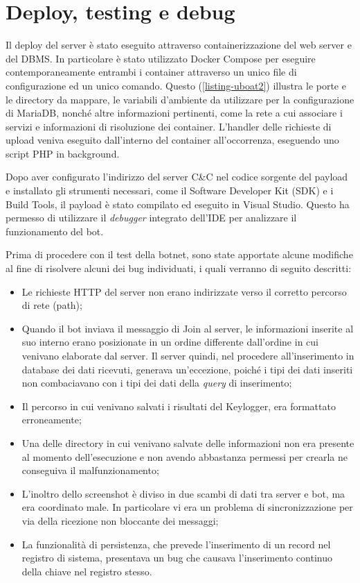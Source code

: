 \section{Deploy, testing e debug}
Il deploy del server è stato eseguito attraverso containerizzazione del web server e del DBMS. In particolare è stato utilizzato Docker Compose per eseguire contemporaneamente entrambi i container attraverso un unico file di configurazione ed un unico comando.
Questo (\ref{listing-uboat2}) illustra le porte e le directory da mappare, le variabili d'ambiente da utilizzare per la configurazione di MariaDB, nonché altre informazioni pertinenti, come la rete a cui associare i servizi e informazioni di risoluzione dei container.
L'handler delle richieste di upload veniva eseguito dall'interno del container all'occorrenza, eseguendo uno script PHP in background.

\medskip 
Dopo aver configurato l'indirizzo del server  C\&C nel codice sorgente del payload e installato gli strumenti necessari, come il Software Developer Kit (SDK) e i Build Tools, il payload è stato compilato ed eseguito in Visual Studio. Questo ha permesso di utilizzare il \textit{debugger} integrato dell'IDE per analizzare il funzionamento del bot.

\medskip
Prima di procedere con il test della botnet, sono state apportate alcune modifiche al fine di risolvere alcuni dei bug individuati, i quali verranno di seguito descritti:
\begin{itemize}
    \item Le richieste HTTP del server non erano indirizzate verso il corretto percorso di rete (path);
    \item Quando il bot inviava il messaggio di Join al server, le informazioni inserite al suo interno erano posizionate in un ordine differente dall'ordine in cui venivano elaborate dal server. Il server quindi, nel procedere all'inserimento in database dei dati ricevuti, generava un'eccezione, poiché i tipi dei dati inseriti non combaciavano con i tipi dei dati della \textit{query} di inserimento;
    \item Il percorso in cui venivano salvati i risultati del Keylogger, era formattato erroneamente;
    \item Una delle directory in cui venivano salvate delle informazioni non era presente al momento dell'esecuzione e non avendo abbastanza permessi per crearla ne conseguiva il malfunzionamento;
    \item L'inoltro dello screenshot è diviso in due scambi di dati tra server e bot, ma era coordinato male. In particolare vi era un problema di sincronizzazione per via della ricezione non bloccante dei messaggi;
    \item La funzionalità di persistenza, che prevede l'inserimento di un record nel registro di sistema, presentava un bug che causava l'inserimento continuo della chiave nel registro stesso.
\end{itemize}

